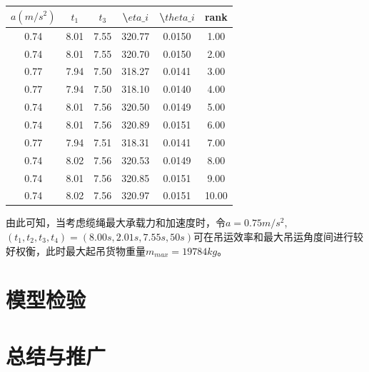 \documentclass[withoutpreface,bwprint]{cumcmthesis} %
\begin{document}
\begin{table}[]
\begin{tabular}{|c|c|c|c|c|c|}
    \hline
$a(m/s^2)$ & $t_1$ & $t_3$ & \textbackslash{}$eta\_i$ & \textbackslash{}$theta\_i$ & rank  \\ \hline
0.74       & 8.01  & 7.55  & 320.77                 & 0.0150                   & 1.00  \\ \hline
0.74       & 8.01  & 7.55  & 320.70                 & 0.0150                   & 2.00  \\ \hline
0.77       & 7.94  & 7.50  & 318.27                 & 0.0141                   & 3.00  \\ \hline
0.77       & 7.94  & 7.50  & 318.10                 & 0.0140                   & 4.00  \\ \hline
0.74       & 8.01  & 7.56  & 320.50                 & 0.0149                   & 5.00  \\ \hline
0.74       & 8.01  & 7.56  & 320.89                 & 0.0151                   & 6.00  \\ \hline
0.77       & 7.94  & 7.51  & 318.31                 & 0.0141                   & 7.00  \\ \hline
0.74       & 8.02  & 7.56  & 320.53                 & 0.0149                   & 8.00  \\ \hline
0.74       & 8.01  & 7.56  & 320.85                 & 0.0151                   & 9.00  \\ \hline
0.74       & 8.02  & 7.56  & 320.97                 & 0.0151                   & 10.00 \\ \hline
\end{tabular}
\end{table}

由此可知，当考虑缆绳最大承载力和加速度时，令$a=0.75m/s^2$,$(t_1,t_2,t_3,t_4)=(8.00s,2.01s,7.55s,50s)$可在吊运效率和最大吊运角度间进行较好权衡，此时最大起吊货物重量$m_{max}=19784kg$。


\section{模型检验}
\subsection{}
\section{总结与推广}
\end{document}
